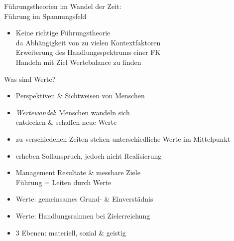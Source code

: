 \documentclass{cheatsheet}
\begin{document}
    \begin{sectionbox}{Führungstheorien im Wandel der Zeit: \\ Führung im Spannungsfeld}
        \begin{itemize}
            \item Keine richtige Führungstheorie\\
            \ra da Abhängigkeit von zu vielen Kontextfaktoren\\
            \ra Erweiterung des Handlungsspektrums einer FK\\
            \ra Handeln mit Ziel Wertebalance zu finden
        \end{itemize}
        \begin{hintbox}{Was sind Werte?}
            \begin{itemize}
                \item Perspektiven \& Sichtweisen von Menschen
                \item \emph{Wertewandel}: Menschen wandeln sich\\
                \ra entdecken \& schaffen neue Werte
                \item zu verschiedenen Zeiten stehen unterschiedliche Werte im Mittelpunkt
                \item erheben Sollanspruch, jedoch nicht Realisierung
            \end{itemize}
        \end{hintbox}
        \begin{itemize}
            \item Management \ra Resultate \& messbare Ziele\\
            \ra Führung = Leiten durch Werte
            \item Werte: gemeinsames Grund- \& Einverstädnis
            \item Werte: Handlungsrahmen bei Zielerreichung
            \item 3 Ebenen: materiell, sozial \& geistig
        \end{itemize}
    \end{sectionbox}
\end{document}
